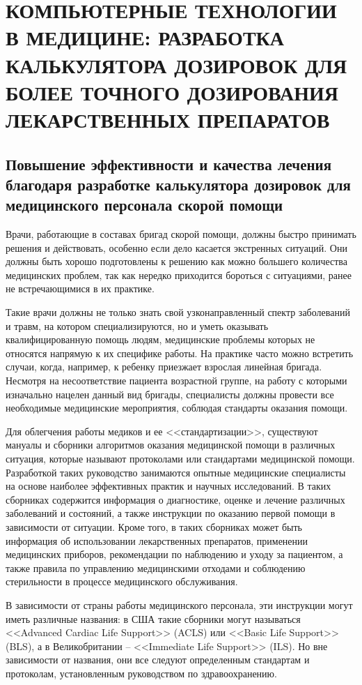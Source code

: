 \section{КОМПЬЮТЕРНЫЕ ТЕХНОЛОГИИ В МЕДИЦИНЕ: РАЗРАБОТКА КАЛЬКУЛЯТОРА ДОЗИРОВОК ДЛЯ БОЛЕЕ ТОЧНОГО ДОЗИРОВАНИЯ ЛЕКАРСТВЕННЫХ ПРЕПАРАТОВ}
\subsection{Повышение эффективности и качества лечения благодаря разработке калькулятора дозировок для медицинского персонала скорой помощи}
Врачи, работающие в составах бригад скорой помощи, должны быстро принимать решения и действовать, особенно если дело касается экстренных ситуаций. Они должны быть хорошо подготовлены к решению как можно большего количества медицинских проблем, так как нередко приходится бороться с ситуациями, ранее не встречающимися в их практике.

Такие врачи должны не только знать свой узконаправленный спектр заболеваний и травм, на котором специализируются, но и уметь оказывать квалифицированную помощь людям, медицинские проблемы которых не относятся напрямую к их специфике работы. На практике часто можно встретить случаи, когда, например, к ребенку приезжает взрослая линейная бригада. Несмотря на несоответствие пациента возрастной группе, на работу с которыми изначально нацелен данный вид бригады, специалисты должны провести все необходимые медицинские мероприятия, соблюдая стандарты оказания помощи.

Для облегчения работы медиков и ее <<стандартизации>>, существуют мануалы и сборники алгоритмов оказания медицинской помощи в различных ситуация, которые называют протоколами или стандартами медицинской помощи. Разработкой таких руководство занимаются опытные медицинские специалисты на основе наиболее эффективных практик и научных исследований. В таких сборниках содержится информация о диагностике, оценке и лечение различных заболеваний и состояний, а также инструкции по оказанию первой помощи в зависимости от ситуации. Кроме того, в таких сборниках может быть информация об использовании лекарственных препаратов, применении медицинских приборов, рекомендации по наблюдению и уходу за пациентом, а также правила по управлению медицинскими отходами и соблюдению стерильности в процессе медицинского обслуживания.

В зависимости от страны работы медицинского персонала, эти инструкции могут иметь различные названия:  в США такие сборники могут называться <<Advanced Cardiac Life Support>> (ACLS) или <<Basic Life Support>> (BLS), а в Великобритании -- <<Immediate Life Support>> (ILS).  Но вне зависимости от названия, они все следуют определенным стандартам и протоколам, установленным руководством по здравоохранению.

